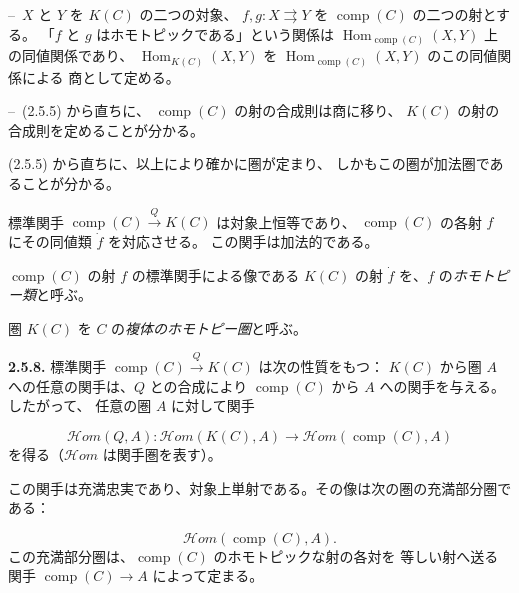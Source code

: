 \clearpage
{}%
\noindent\hspace*{2em}--\ $X$ と $Y$ を $K(C)$ の二つの対象、
$f,g\colon X\rightrightarrows Y$ を $\operatorname{comp}(C)$ の二つの射とする。
「$f$ と $g$ はホモトピックである」という関係は
$\operatorname{Hom}_{\operatorname{comp}(C)}(X,Y)$ 上の同値関係であり、
$\operatorname{Hom}_{K(C)}(X,Y)$ を
$\operatorname{Hom}_{\operatorname{comp}(C)}(X,Y)$ のこの同値関係による
商として定める。

\noindent\hspace*{2em}--\ (2.5.5) から直ちに、
$\operatorname{comp}(C)$ の射の合成則は商に移り、
$K(C)$ の射の合成則を定めることが分かる。

(2.5.5) から直ちに、以上により確かに圏が定まり、
しかもこの圏が加法圏であることが分かる。

標準関手 $\operatorname{comp}(C)\xrightarrow{Q}K(C)$ は対象上恒等であり、
$\operatorname{comp}(C)$ の各射 $f$ にその同値類 $\dot f$ を対応させる。
この関手は加法的である。

$\operatorname{comp}(C)$ の射 $f$ の標準関手による像である
$K(C)$ の射 $\dot f$ を、$f$ の\emph{ホモトピー類}と呼ぶ。

圏 $K(C)$ を $C$ の\emph{複体のホモトピー圏}と呼ぶ。

\noindent\textbf{2.5.8.}\quad
標準関手 $\operatorname{comp}(C)\xrightarrow{Q}K(C)$ は次の性質をもつ：
$K(C)$ から圏 $A$ への任意の関手は、$Q$ との合成により
$\operatorname{comp}(C)$ から $A$ への関手を与える。したがって、
任意の圏 $A$ に対して関手

\begin{equation*}
  \mathcal H\!om(Q,A)\colon
  \mathcal H\!om(K(C),A)
  \longrightarrow
  \mathcal H\!om(\operatorname{comp}(C),A)
\end{equation*}
を得る（$\mathcal H\!om$ は関手圏を表す）。

この関手は充満忠実であり、対象上単射である。その像は次の圏の充満部分圏である：

\begin{equation*}
  \mathcal H\!om(\operatorname{comp}(C),A).
\end{equation*}
この充満部分圏は、$\operatorname{comp}(C)$ のホモトピックな射の各対を
等しい射へ送る関手 $\operatorname{comp}(C)\longrightarrow A$ によって定まる。

